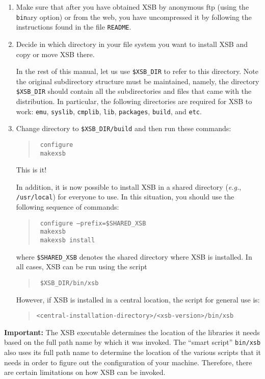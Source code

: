 \begin{enumerate}
\item   Make sure that after you have obtained XSB by anonymous ftp 
	(using the {\tt bin}ary option) or from the web, you have
	uncompressed it by following the instructions found in the
	file {\tt README}.

\item	Decide in which directory in your file system you want to
	install XSB and copy or move XSB there.

	In the rest of this manual, let us use {\tt \$XSB\_DIR}  to
	refer to this directory.  Note the original subdirectory
	structure must be maintained, namely, the directory
	{\tt \$XSB\_DIR}  should contain all the subdirectories and files
	that came with the distribution. In particular, the following
	directories are required for XSB to work:
	\verb'emu', \verb'syslib', \verb'cmplib', 
	\verb'lib', \verb'packages', \verb'build', and \verb'etc'.

\item Change directory to {\tt \$XSB\_DIR/build} and then run these commands:
  \begin{quote}
    \tt
    configure\\
    \tt
    makexsb
  \end{quote}
  This is it!
  
  In addition, it is now possible to install XSB in a shared directory
  ({\it e.g.}, {\tt /usr/local}) for everyone to use.  In this situation,
  you should use the following sequence of commands:
  \begin{quote}
    \tt
    configure --prefix=\$SHARED\_XSB\\
    \tt
    makexsb\\
    \tt
    makexsb install
  \end{quote}
  where {\tt \$SHARED\_XSB}  denotes the shared directory where XSB is
  installed.  In all cases, XSB can be run using the script
  \begin{quote}
    \tt
    \$XSB\_DIR/bin/xsb
  \end{quote}
  However, if XSB is installed in a central location, the script for
  general use is:
  \begin{quote}
    \verb'<central-installation-directory>/<xsb-version>/bin/xsb'
  \end{quote}
\end{enumerate}

{\bf Important:} The XSB executable determines the location of the
libraries it needs based on the full path name by which it was invoked.
The ``smart script'' \verb|bin/xsb| also uses its full path name to
determine the location of the various scripts that it needs in order to
figure out the configuration of your machine.  Therefore, there are certain
limitations on how XSB can be invoked.

